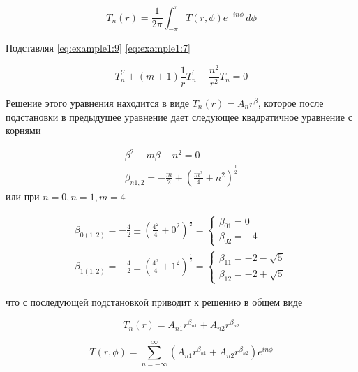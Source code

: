 \begin{equation}
	\label{eq:example1:9}
	T_n(r) = \frac{1}{2\pi} \int_{-\pi}^{\pi} T(r, \phi) e^{-in\phi} \,d\phi
\end{equation}

Подставляя \cref{eq:example1:9} \cref{eq:example1:7}

\begin{equation}
	\label{eq:example1:10}
	T_{n}^{\prime \prime} + (m+1)\frac{1}{r}T_{n}^{\prime}-\frac{n^2}{r^2}T_{n} =0
\end{equation}

Решение этого уравнения находится в виде \(T_n(r) = A_n r^{\beta}\), которое после подстановки в предыдущее уравнение дает следующее квадратичное уравнение с корнями

\begin{equation*}
	\begin{split}
		\beta^2 +m \beta - n^2 =0\\
		\beta_{n1,2} = -\frac{m}{2} \pm \left(\frac{m^2}{4} + n^2 \right)^{\frac{1}{2}}
	\end{split}
\end{equation*}
или
при \(n=0, n=1, m=4\)

\begin{equation*}
	\begin{split}
		\beta_{0(1,2)} = -\frac{4}{2} \pm \left(\frac{4^2}{4} + 0^2 \right)^{\frac{1}{2}} = 
		\begin{cases}
			\beta_{01} = 0\\
			\beta_{02} = -4
		\end{cases}\\
		\beta_{1(1,2)} = -\frac{4}{2} \pm \left(\frac{4^2}{4} + 1^2 \right)^{\frac{1}{2}} =
		\begin{cases}
			\beta_{11} = -2-\sqrt{5}\\
			\beta_{12} = -2+\sqrt{5}
		\end{cases}
	\end{split}
\end{equation*}

что с последующей подстановкой приводит к решению в общем виде

\begin{equation*}
	T_n(r) = A_{n1} r^{\beta_{n1}} + A_{n2} r^{\beta_{n2}}
\end{equation*}

\begin{equation}
	\label{eq:example1:11}
	T(r, \phi) = \sum_{n=-\infty}^{\infty} \left ( A_{n1} r^{\beta_{n1}} + A_{n2} r^{\beta_{n2}} \right ) e^{in\phi}
\end{equation}



